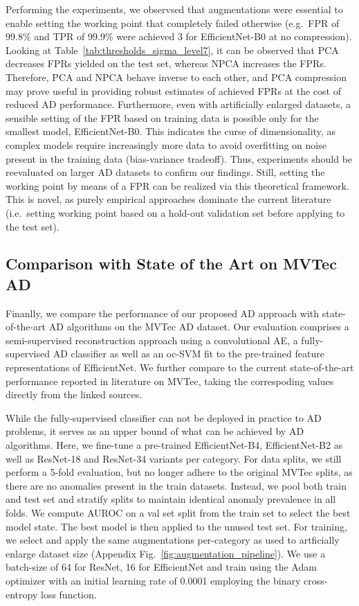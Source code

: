 \documentclass[conference, a4paper]{./template/IEEEtran}
\begin{document}
Performing the experiments, we observsed that augmentations were essential to enable setting the working point that completely failed otherwise (e.g.\ FPR of 99.8\% and TPR of 99.9\% were achieved 3 for EfficientNet-B0 at no compression).
Looking at Table~\ref{tab:thresholds_sigma_level7}, it can be observed that PCA decreases FPRs yielded on the test set, whereas NPCA increases the FPRs.
Therefore, PCA and NPCA behave inverse to each other, and PCA compression may prove useful in providing robust estimates of achieved FPRs at the cost of reduced AD performance.
Furthermore, even with artificially enlarged datasets, a sensible setting of the FPR based on training data is possible only for the smallest model, EfficientNet-B0.
This indicates the curse of dimensionality, as complex models require increasingly more data to avoid overfitting on noise present in the training data (bias-variance tradeoff).
Thus, experiments should be reevaluated on larger AD datasets to confirm our findings.
Still, setting the working point by means of a FPR can be realized via this theoretical framework. This is novel, as purely empirical approaches dominate the current literature (i.e.\ setting working point based on a hold-out validation set before applying to the test set).



\subsection{Comparison with State of the Art on MVTec AD}

Finanlly, we compare the performance of our proposed AD approach with state-of-the-art AD algorithms on the MVTec AD dataset.
Our evaluation comprises a semi-supervised reconstruction approach using a convolutional AE, a fully-supervised AD classifier as well as an oc-SVM fit to the pre-trained feature representations of EfficientNet.
We further compare to the current state-of-the-art performance reported in literature on MVTec, taking the correspoding values directly from the linked sources.

While the fully-supervised classifier can not be deployed in practice to AD problems, it serves as an upper bound of what can be achieved by AD algorithms.
Here, we fine-tune a pre-trained EfficientNet-B4, EfficientNet-B2 as well as ResNet-18 and ResNet-34 variants per category.
For data splits, we still perform a 5-fold evaluation, but no longer adhere to the original MVTec splits, as there are no anomalies present in the train datasets.
Instead, we pool both train and test set and stratify splits to maintain identical anomaly prevalence in all folds.
We compute AUROC on a val set split from the train set to select the best model state.
The best model is then applied to the unused test set.
For training, we select and apply the same augmentations per-category as used to artficially enlarge dataset size (Appendix Fig.~\ref{fig:augmentation_pipeline}). 
We use a batch-size of 64 for ResNet, 16 for EfficientNet and train using the Adam \cite{Kingma2015} optimizer with an initial learning rate of 0.0001 employing the binary cross-entropy loss function. 
\end{document}
